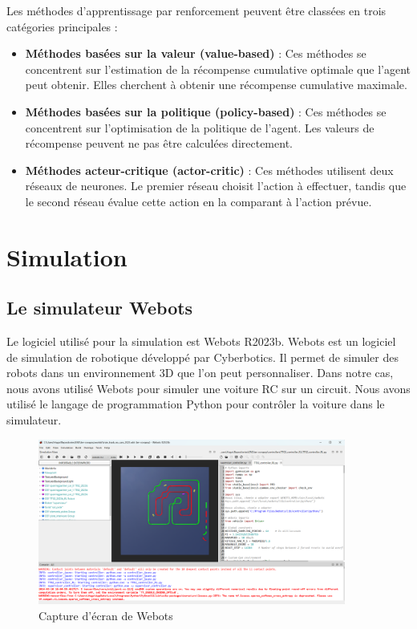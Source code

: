 \documentclass[french]{article}
\begin{document}
\vspace{0.5cm}
\noindent
Les méthodes d'apprentissage par renforcement peuvent être classées en trois catégories principales :
\begin{itemize}
\item \textbf{Méthodes basées sur la valeur (value-based)} : Ces méthodes se concentrent sur l'estimation de la récompense cumulative optimale que l'agent peut obtenir. Elles cherchent à obtenir une récompense cumulative maximale.
\item \textbf{Méthodes basées sur la politique (policy-based)} : Ces méthodes se concentrent sur l'optimisation de la politique de l'agent. Les valeurs de récompense peuvent ne pas être calculées directement.
\item \textbf{Méthodes acteur-critique (actor-critic)} : Ces méthodes utilisent deux réseaux de neurones. Le premier réseau choisit l'action à effectuer, tandis que le second réseau évalue cette action en la comparant à l'action prévue.
\end{itemize}


\section{Simulation}

\subsection{Le simulateur Webots}
Le logiciel utilisé pour la simulation est Webots R2023b. Webots est un logiciel de simulation de robotique développé 
par Cyberbotics. Il permet de simuler des robots dans un environnement 3D que l'on peut personnaliser. Dans notre cas,
nous avons utilisé Webots pour simuler une voiture RC sur un circuit. Nous avons utilisé le langage de programmation
Python pour contrôler la voiture dans le simulateur.

\begin{figure}[H]
    \centering
    \includegraphics[width=0.9\textwidth]{Images/Webots.png}
    \caption{Capture d'écran de Webots}
\end{figure}
\end{document}
